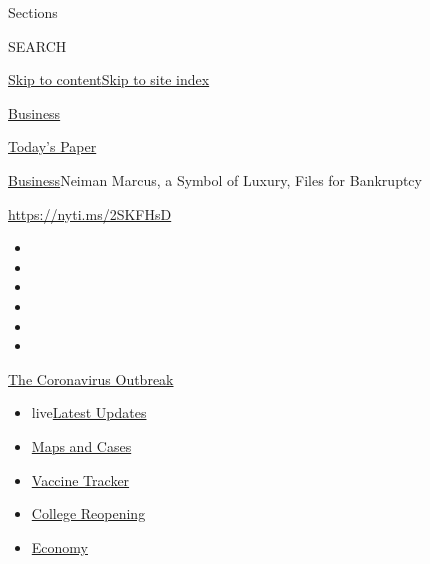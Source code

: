 Sections

SEARCH

\protect\hyperlink{site-content}{Skip to
content}\protect\hyperlink{site-index}{Skip to site index}

\href{https://www.nytimes3xbfgragh.onion/section/business}{Business}

\href{https://myaccount.nytimes3xbfgragh.onion/auth/login?response_type=cookie\&client_id=vi}{}

\href{https://www.nytimes3xbfgragh.onion/section/todayspaper}{Today's
Paper}

\href{/section/business}{Business}\textbar{}Neiman Marcus, a Symbol of
Luxury, Files for Bankruptcy

\href{https://nyti.ms/2SKFHsD}{https://nyti.ms/2SKFHsD}

\begin{itemize}
\item
\item
\item
\item
\item
\item
\end{itemize}

\href{https://www.nytimes3xbfgragh.onion/news-event/coronavirus?action=click\&pgtype=Article\&state=default\&region=TOP_BANNER\&context=storylines_menu}{The
Coronavirus Outbreak}

\begin{itemize}
\tightlist
\item
  live\href{https://www.nytimes3xbfgragh.onion/2020/08/03/world/coronavirus-covid-19.html?action=click\&pgtype=Article\&state=default\&region=TOP_BANNER\&context=storylines_menu}{Latest
  Updates}
\item
  \href{https://www.nytimes3xbfgragh.onion/interactive/2020/us/coronavirus-us-cases.html?action=click\&pgtype=Article\&state=default\&region=TOP_BANNER\&context=storylines_menu}{Maps
  and Cases}
\item
  \href{https://www.nytimes3xbfgragh.onion/interactive/2020/science/coronavirus-vaccine-tracker.html?action=click\&pgtype=Article\&state=default\&region=TOP_BANNER\&context=storylines_menu}{Vaccine
  Tracker}
\item
  \href{https://www.nytimes3xbfgragh.onion/2020/08/02/us/covid-college-reopening.html?action=click\&pgtype=Article\&state=default\&region=TOP_BANNER\&context=storylines_menu}{College
  Reopening}
\item
  \href{https://www.nytimes3xbfgragh.onion/live/2020/08/03/business/stock-market-today-coronavirus?action=click\&pgtype=Article\&state=default\&region=TOP_BANNER\&context=storylines_menu}{Economy}
\end{itemize}

